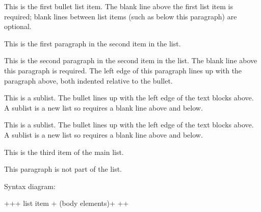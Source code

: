 \documentclass[letterpaper,12pt,english]{sphinxmanual}
\begin{document}
\begin{sphinxVerbatim}[commandchars=\\\{\}]
 This is the first bullet list item.  The blank line above the
  first list item is required; blank lines between list items
  (such as below this paragraph) are optional.

 This is the first paragraph in the second item in the list.

  This is the second paragraph in the second item in the list.
  The blank line above this paragraph is required.  The left edge
  of this paragraph lines up with the paragraph above, both
  indented relative to the bullet.

   This is a sublist.  The bullet lines up with the left edge of
    the text blocks above.  A sublist is a new list so requires a
    blank line above and below.

   This is a sublist.  The bullet lines up with the left edge of
the text blocks above.  A sublist is a new list so requires a
blank line above and below.

 This is the third item of the main list.

This paragraph is not part of the list.
\end{sphinxVerbatim}

Syntax diagram:

\begin{sphinxVerbatim}[commandchars=\\\{\}]
+\PYGZhy{}\PYGZhy{}\PYGZhy{}\PYGZhy{}\PYGZhy{}\PYGZhy{}+\PYGZhy{}\PYGZhy{}\PYGZhy{}\PYGZhy{}\PYGZhy{}\PYGZhy{}\PYGZhy{}\PYGZhy{}\PYGZhy{}\PYGZhy{}\PYGZhy{}\PYGZhy{}\PYGZhy{}\PYGZhy{}\PYGZhy{}\PYGZhy{}\PYGZhy{}\PYGZhy{}\PYGZhy{}\PYGZhy{}\PYGZhy{}\PYGZhy{}\PYGZhy{}+
 \PYGZdq{}\PYGZhy{} \PYGZdq{} \textbar{} list item             \textbar{}
+\PYGZhy{}\PYGZhy{}\PYGZhy{}\PYGZhy{}\PYGZhy{}\PYGZhy{}\textbar{} (body elements)+      \textbar{}
       +\PYGZhy{}\PYGZhy{}\PYGZhy{}\PYGZhy{}\PYGZhy{}\PYGZhy{}\PYGZhy{}\PYGZhy{}\PYGZhy{}\PYGZhy{}\PYGZhy{}\PYGZhy{}\PYGZhy{}\PYGZhy{}\PYGZhy{}\PYGZhy{}\PYGZhy{}\PYGZhy{}\PYGZhy{}\PYGZhy{}\PYGZhy{}\PYGZhy{}\PYGZhy{}+
\end{sphinxVerbatim}
\end{document}
